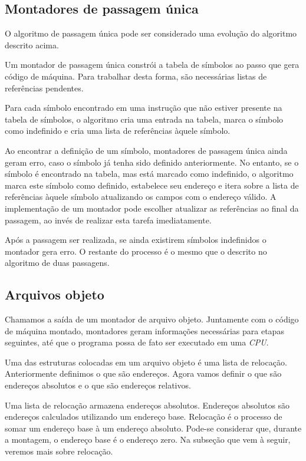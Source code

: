 \subsection{Montadores de passagem única}

O algoritmo de passagem única pode ser considerado uma evolução do algoritmo descrito acima.

Um montador de passagem única constrói a tabela de símbolos ao passo que gera código de máquina. Para trabalhar desta forma, são necessárias listas de referências pendentes.

Para cada símbolo encontrado em uma instrução que não estiver presente na tabela de símbolos, o algoritmo cria uma entrada na tabela, marca o símbolo como indefinido e cria uma lista de referências àquele símbolo.

Ao encontrar a definição de um símbolo, montadores de passagem única ainda geram erro, caso o símbolo já tenha sido definido anteriormente. No entanto, se o símbolo é encontrado na tabela, mas está marcado como indefinido, o algoritmo marca este símbolo como definido, estabelece seu endereço e itera sobre a lista de referências àquele símbolo atualizando os campos com o endereço válido. A implementação de um montador pode escolher atualizar as referências ao final da passagem, ao invés de realizar esta tarefa imediatamente.

Após a passagem ser realizada, se ainda existirem símbolos indefinidos o montador gera erro. O restante do processo é o mesmo que o descrito no algoritmo de duas passagens.

\subsection{Arquivos objeto}

Chamamos a saída de um montador de arquivo objeto. Juntamente com o código de máquina montado, montadores geram informações necessárias para etapas seguintes, até que o programa possa de fato ser executado em uma \textit{CPU}.

Uma das estruturas colocadas em um arquivo objeto é uma lista de relocação. Anteriormente definimos o que são endereços. Agora vamos definir o que são endereços absolutos e o que são endereços relativos.

Uma lista de relocação armazena endereços absolutos. Endereços absolutos são endereços calculados utilizando um endereço base. Relocação é o processo de somar um endereço base à um endereço absoluto. Pode-se considerar que, durante a montagem, o endereço base é o endereço zero. Na subseção que vem à seguir, veremos mais sobre relocação.

